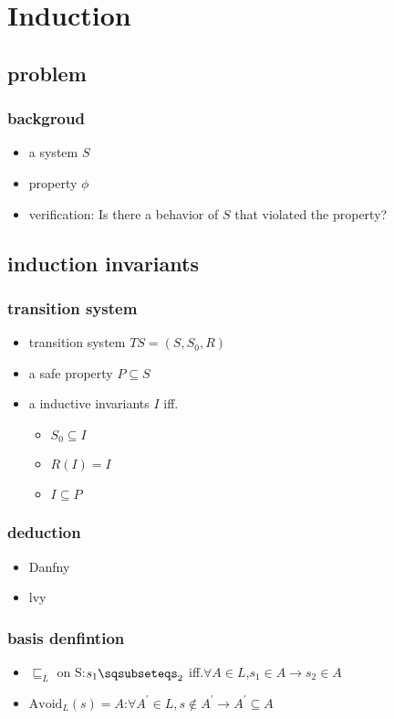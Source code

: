 \section{Induction}
\subsection{problem}
\begin{frame}
    \frametitle{backgroud}
    \begin{itemize}
        \item a system $S$
        \item property $\phi$
        \item verification: Is there a behavior of $S$ that violated the property?
    \end{itemize}
\end{frame}

\subsection{induction invariants}
\begin{frame}
    \frametitle{transition system}
    \begin{itemize}
        \item transition system $TS=(S,S_{0},R)$
        \item a safe property $P\subseteq S$
        \item a inductive invariants $I$ iff.
        \begin{itemize}
            \item $S_{0}\subseteq I$
            \item $R(I)=I$
            \item $I\subseteq P$
        \end{itemize}
    \end{itemize}
\end{frame}
\begin{frame}
    \frametitle{deduction}
    \begin{itemize}
        \item Danfny
        \item lvy
    \end{itemize}
\end{frame}

\begin{frame}
    \frametitle{basis denfintion}
    \begin{itemize}
        \item $\sqsubseteq_{L}$ on S:$s_{1}\sqsubseteqs_{2}$ iff.$\forall A\in L$,$s_{1}\in A\rightarrow s_{2}\in A$
        \item $\text{Avoid}_{L}(s)=A$:$\forall A^{\prime}\in L, s\notin A^{\prime}\rightarrow A^{\prime}\subseteq A$
    \end{itemize}
\end{frame}